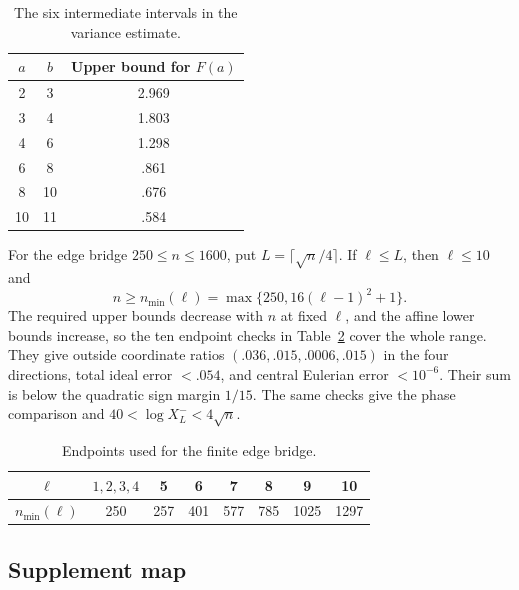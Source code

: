 \begin{table}[htbp]
\centering\small
\begin{tabular}{ccc}
\toprule
$a$ & $b$ & Upper bound for $F(a)$ \\
\midrule
2&3&2.969\\
3&4&1.803\\
4&6&1.298\\
6&8&.861\\
8&10&.676\\
10&11&.584\\
\bottomrule
\end{tabular}
\caption{The six intermediate intervals in the variance estimate.}
\label{tab:variance-numerical}
\end{table}

For the edge bridge $250\le n\le1600$, put
$L=\lceil\sqrt n/4\rceil$. If $\ell\le L$, then $\ell\le10$ and
\[
 n\ge n_{\min}(\ell)=\max\{250,16(\ell-1)^2+1\}.
\]
The required upper bounds decrease with $n$ at fixed $\ell$, and the
affine lower bounds increase, so the
ten endpoint checks in Table~\ref{tab:finite-edge-endpoints} cover the
whole range. They give outside coordinate ratios
$(.036,.015,.0006,.015)$ in the four directions, total ideal error
$<.054$, and central Eulerian error $<10^{-6}$. Their sum is below the
quadratic sign margin $1/15$. The same checks give the phase comparison
and $40<\log X_L^-<4\sqrt n$.

\begin{table}[htbp]
\centering\small
\begin{tabular}{cccccccc}
\toprule
$\ell$&$1,2,3,4$&5&6&7&8&9&10\\
\midrule
$n_{\min}(\ell)$&250&257&401&577&785&1025&1297\\
\bottomrule
\end{tabular}
\caption{Endpoints used for the finite edge bridge.}
\label{tab:finite-edge-endpoints}
\end{table}

\subsection{Supplement map}


